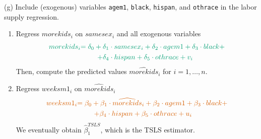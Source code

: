 \documentclass[
  10pt,
  ignorenonframetext,
]{beamer}
\begin{document}
\begin{frame}{(g) Include (exogenous) variables \texttt{agem1},
\texttt{black}, \texttt{hispan}, and \texttt{othrace} in the labor
supply regression.}
\protect\hypertarget{g-include-exogenous-variables-agem1-black-hispan-and-othrace-in-the-labor-supply-regression.}{}
\begin{enumerate}
\item
  Regress \(morekids_i\) on \(samesex_i\) and all exogenous variables
  \begin{equation*}
  \begin{split}
  \color{green}{morekids_i} &\color{green}{= \delta_0 + \delta_1 \cdot samesex_i + \delta_2 \cdot agem1 + \delta_3 \cdot black + }\\
  &\hspace{24pt} \color{green}{+ \delta_4 \cdot hispan + \delta_5 \cdot othrace + v_i}
  \end{split}
  \end{equation*} Then, compute the predicted values
  \(\widehat{morekids}_i\) for \(i = 1,\ldots,n.\)
\item
  Regress \(weeksm1_i\) on \(\widehat{morekids}_i\) \begin{equation*}
  \begin{split}
  \color{red}{weeksm1_i} &\color{red}{= \beta_0 + \beta_1 \cdot \widehat{morekids}_i + \beta_2 \cdot agem1 + \beta_3 \cdot black + } \\ 
  &\hspace{24pt} \color{red}{+\beta_4 \cdot hispan + \beta_5 \cdot othrace + u_i}
  \end{split}
  \end{equation*} We eventually obtain \(\hat{\beta}_1^{TSLS}\), which
  is the TSLS estimator.
\end{enumerate}
\end{frame}
\end{document}
